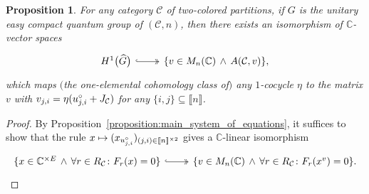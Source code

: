 \documentclass[10pt,a4paper]{amsart}
\numberwithin{equation}{section}
\newtheorem{Proposition}[Theorem]{Proposition}
{ \theoremstyle{definition}
\newtheorem{Definition}[Theorem]{Definition}
\newtheorem{Note}[Theorem]{Note}
\newtheorem{Example}[Theorem]{Example}
\newtheorem{Remark}[Theorem]{Remark}
\newtheorem{Notation}[Theorem]{Notation}
\newtheorem{Assumptions}[Theorem]{Assumptions}
}
\newcommand{\thefuncxx}[2]{F_{#1}(#2)}
\newcommand{\Sand}{\,\wedge\,}
\newcommand{\quantorpredicate}{\colon }
\newcommand{\comps}{\mathbb{C}}
\newcommand{\dwi}[1]{\llbracket{#1}\rrbracket}
\newcommand{\Sdirectproduct}{\times}
\newcommand{\Ssetmonoidalproduct}{\times}
\newcommand{\whpoint}{\mathnormal{\circ}}
\newcommand{\Yc}[1]{\mathfrak{#1}}
\newcommand{\squarematrices}[2]{M_{#1}(#2)}
\newcommand{\DQGcohomologyTC}[2]{H^{#1} \bigl(#2 \bigr)}
\newcommand{\CQGdualC}[1]{\widehat{#1}}
\newcommand{\thedim}{n}
\newcommand{\theqg}{G}
\newcommand{\thegens}{E}
\newcommand{\theuni}{u}
\newcommand{\theunix}[3]{\theuni^{#1}_{#2,#3}}
\newcommand{\therels}{R}
\newcommand{\thepartrels}[1]{\therels_{#1}}
\newcommand{\thecat}{\mathcal{C}}
\newcommand{\theideal}{J}
\newcommand{\thepartideal}[1]{\theideal_{#1}}
\newcommand{\thepredicatex}[2]{A(#1,#2)}
\begin{document}
{
  \newcommand{\somerel}{r}
  \newcommand{\indj}{j}
  \newcommand{\indi}{i}
  \newcommand{\indg}{g}
  \newcommand{\indh}{h}
  \newcommand{\incol}{\Yc{c}}
  \newcommand{\outcol}{\Yc{d}}
  \newcommand{\incolx}[1]{\Yc{c}_{#1}}
  \newcommand{\outcolx}[1]{\Yc{d}_{#1}}
  \newcommand{\inlen}{k}
  \newcommand{\outlen}{\ell}
  \newcommand{\infree}{g}
  \newcommand{\outfree}{j}
  \newcommand{\inbound}{h}
  \newcommand{\outbound}{i}
  \newcommand{\infreex}[1]{g_{#1}}
  \newcommand{\outfreex}[1]{j_{#1}}
  \newcommand{\inboundx}[1]{h_{#1}}
  \newcommand{\outboundx}[1]{i_{#1}}
  \newcommand{\incounter}{a}
  \newcommand{\outcounter}{b}
  \newcommand{\thepartition}{p}
  \newcommand{\themat}{v}
  \newcommand{\thematx}[2]{v_{#1,#2}}
  \newcommand{\thetuple}{x^\themat}
  \newcommand{\thetuplex}[1]{x_{#1}^\themat}
  \newcommand{\somecocycle}{\eta}
  \begin{Proposition}
    \label{proposition:main-one-explication}
    For any category $\thecat$ of two-co\-lo\-red partitions,
    if $\theqg$ is the unitary easy compact quantum group of $(\thecat,\thedim)$,
then there exists an isomorphism of $\comps$-vector spaces
\[
  \begin{tikzcd}
  \DQGcohomologyTC{1}{\CQGdualC{\theqg}} \arrow[r, two heads, hook]& \{ \themat\in \squarematrices{\thedim}{\comps}\Sand \thepredicatex{\thecat}{\themat}  \}  ,
  \end{tikzcd}
\]
which maps $($the one-elemental cohomology class of$)$ any $1$-cocycle $\somecocycle$ to the matrix $\themat$ with  $\thematx{\indj}{\indi}= \somecocycle(\theunix{\whpoint}{\indj}{\indi}+\thepartideal{\thecat})$ for any $\{\indi,\indj\}\subseteq \dwi{\thedim}$.
\end{Proposition}
\begin{proof}
  \newcommand{\qgmodule}{W}
  \newcommand{\somescalar}{\lambda}
  \newcommand{\someel}{a}
  \newcommand{\thefullcategenextended}{\mathcal{R}'}
  \newcommand{\thefullrels}{R'}
  \newcommand{\theiso}{\varphi}
  \newcommand{\betterqgmodule}{X}
  \newcommand{\sometuple}{x}
  \newcommand{\sometuplex}[1]{x_{#1}}
  \newcommand{\somegen}{e}
  \newcommand{\somepoly}{p}
  \newcommand{\relocatedcocycle}{\overline{\eta}}
  \newcommand{\anycol}{\Yc{c}}
  \newcommand{\thefullideal}{J'}
  By Pro\-po\-si\-tion~\ref{proposition:main_system_of_equations}, it suffices to show that the rule $\sometuple\mapsto (\sometuplex{\theunix{\whpoint}{\indj}{\indi}})_{(\indj,\indi)\in\dwi{\thedim}^{\Ssetmonoidalproduct 2}}$ gives a $\comps$-linear isomorphism
  \[
    \begin{tikzcd}
      \{\sometuple\in \comps^{\Sdirectproduct \thegens}\Sand \forall \somerel\in\thepartrels{\thecat}\quantorpredicate \thefuncxx{\somerel}{\sometuple}=0 \}\arrow[r,two heads, hook]& \{ \themat\in \squarematrices{\thedim}{\comps}\Sand \forall \somerel\in\thepartrels{\thecat}\quantorpredicate \thefuncxx{\somerel}{\thetuple}=0  \} .
    \end{tikzcd}
  \]


\end{proof}}
\end{document}
